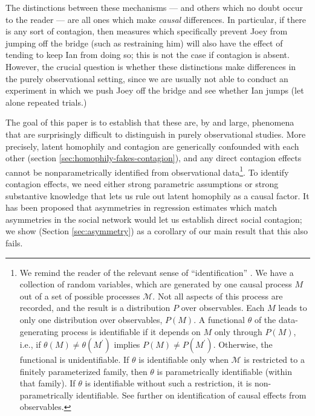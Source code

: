 \documentclass{article}
\begin{document}
\begin{multicols}{2}
The distinctions between these mechanisms --- and others which no doubt occur
to the reader --- are all ones which make {\em causal} differences.  In
particular, if there is any sort of contagion, then measures which specifically
prevent Joey from jumping off the bridge (such as restraining him) will also
have the effect of tending to keep Ian from doing so; this is not the case if
contagion is absent.  However, the crucial question is whether these
distinctions make differences in the purely observational setting, since we are
usually not able to conduct an experiment in which we push Joey off the bridge
and see whether Ian jumps (let alone repeated trials.)

The goal of this paper is to establish that these are, by and large,
phenomena that are surprisingly difficult to distinguish in purely 
observational studies.  More precisely, latent homophily
and contagion are generically confounded with each other (section
\ref{sec:homophily-fakes-contagion}), and any direct contagion effects cannot
be nonparametrically identified from observational data\footnote{We remind the
  reader of the relevant sense of ``identification''
  \citep{Manski-identification-for-prediction}.  We have a collection of random
  variables, which are generated by one causal process $M$ out of a set of
  possible processes $\mathcal{M}$.  Not all aspects of this process are
  recorded, and the result is a distribution $P$ over observables.  Each $M$
  leads to only one distribution over observables, $P(M)$.  A functional
  $\theta$ of the data-generating process is identifiable if it depends on $M$
  only through $P(M)$, i.e., if $\theta(M) \neq \theta(M^{\prime})$ implies
  $P(M) \neq P(M^{\prime})$.  Otherwise, the functional is unidentifiable.  If
  $\theta$ is identifiable only when $\mathcal{M}$ is restricted to a finitely
  parameterized family, then $\theta$ is parametrically identifiable (within
  that family).  If $\theta$ is identifiable without such a restriction, it is
  non-parametrically identifiable.  See further \citet[ch.\
  3]{Pearl-causality-2nd} on identification of causal effects from
  observables.}.  To identify contagion effects, we need either strong
parametric assumptions or strong substantive knowledge that lets us rule out
latent homophily as a causal factor.  It has been proposed that asymmetries in
regression estimates which match asymmetries in the social network would let us
establish direct social contagion; we show (Section \ref{sec:asymmetry}) as a
corollary of our main result that this also fails.


\end{multicols}
\end{document}
